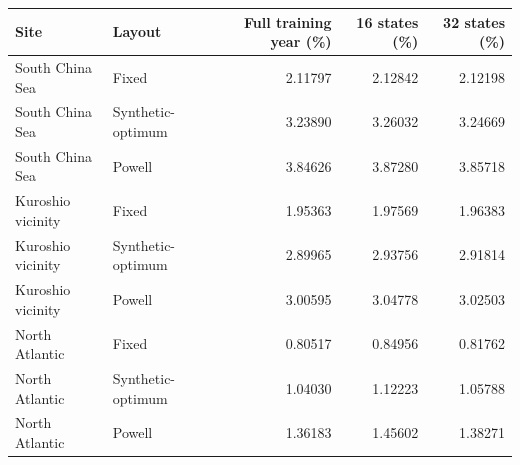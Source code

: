 \begin{tabular}{llrrr}
\toprule
Site & Layout & Full training year (\%) & 16 states (\%) & 32 states (\%) \\
\midrule
South China Sea & Fixed & 2.11797 & 2.12842 & 2.12198 \\
South China Sea & Synthetic-optimum & 3.23890 & 3.26032 & 3.24669 \\
South China Sea & Powell & 3.84626 & 3.87280 & 3.85718 \\
Kuroshio vicinity & Fixed & 1.95363 & 1.97569 & 1.96383 \\
Kuroshio vicinity & Synthetic-optimum & 2.89965 & 2.93756 & 2.91814 \\
Kuroshio vicinity & Powell & 3.00595 & 3.04778 & 3.02503 \\
North Atlantic & Fixed & 0.80517 & 0.84956 & 0.81762 \\
North Atlantic & Synthetic-optimum & 1.04030 & 1.12223 & 1.05788 \\
North Atlantic & Powell & 1.36183 & 1.45602 & 1.38271 \\
\bottomrule
\end{tabular}
